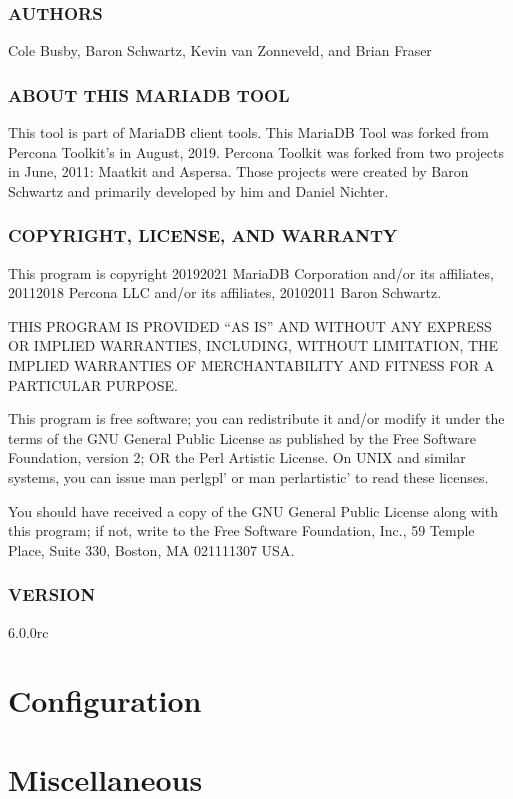 \documentclass[letterpaper,10pt,english]{sphinxmanual}
\begin{document}
\section{AUTHORS}
\label{\detokenize{mariadb-system-summary:authors}}
Cole Busby, Baron Schwartz, Kevin van Zonneveld, and Brian Fraser


\section{ABOUT THIS MARIADB TOOL}
\label{\detokenize{mariadb-system-summary:about-this-mariadb-tool}}
This tool is part of MariaDB client tools. This MariaDB Tool was forked from
Percona Toolkit’s  in August, 2019. Percona Toolkit was
forked from two projects in June, 2011: Maatkit and Aspersa.  Those projects
were created by Baron Schwartz and primarily developed by him and Daniel Nichter.


\section{COPYRIGHT, LICENSE, AND WARRANTY}
\label{\detokenize{mariadb-system-summary:copyright-license-and-warranty}}
This program is copyright 2019\sphinxhyphen{}2021 MariaDB Corporation and/or its affiliates,
2011\sphinxhyphen{}2018 Percona LLC and/or its affiliates, 2010\sphinxhyphen{}2011 Baron Schwartz.

THIS PROGRAM IS PROVIDED “AS IS” AND WITHOUT ANY EXPRESS OR IMPLIED
WARRANTIES, INCLUDING, WITHOUT LIMITATION, THE IMPLIED WARRANTIES OF
MERCHANTABILITY AND FITNESS FOR A PARTICULAR PURPOSE.

This program is free software; you can redistribute it and/or modify it under
the terms of the GNU General Public License as published by the Free Software
Foundation, version 2; OR the Perl Artistic License.  On UNIX and similar
systems, you can issue \textasciigrave{}man perlgpl’ or \textasciigrave{}man perlartistic’ to read these
licenses.

You should have received a copy of the GNU General Public License along with
this program; if not, write to the Free Software Foundation, Inc., 59 Temple
Place, Suite 330, Boston, MA  02111\sphinxhyphen{}1307  USA.


\section{VERSION}
\label{\detokenize{mariadb-system-summary:version}}
 6.0.0rc


\part{Configuration}
\label{\detokenize{index:configuration}}

\part{Miscellaneous}
\label{\detokenize{index:miscellaneous}}


\renewcommand{\indexname}{Index}
\printindex
\end{document}
